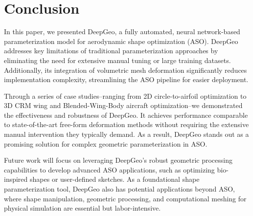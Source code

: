 \section{Conclusion}

In this paper, we presented DeepGeo, a fully automated, neural network-based parameterization model for aerodynamic shape optimization (ASO). DeepGeo addresses key limitations of traditional parameterization approaches by eliminating the need for extensive manual tuning or large training datasets. Additionally, its integration of volumetric mesh deformation significantly reduces implementation complexity, streamlining the ASO pipeline for easier deployment.

Through a series of case studies--ranging from 2D circle-to-airfoil optimization to 3D CRM wing and Blended-Wing-Body aircraft optimization--we demonstrated the effectiveness and robustness of DeepGeo. It achieves performance comparable to state-of-the-art free-form deformation methods without requiring the extensive manual intervention they typically demand. As a result, DeepGeo stands out as a promising solution for complex geometric parameterization in ASO.

Future work will focus on leveraging DeepGeo's robust geometric processing capabilities to develop advanced ASO applications, such as optimizing bio-inspired shapes or user-defined sketches. As a foundational shape parameterization tool, DeepGeo also has potential applications beyond ASO, where shape manipulation, geometric processing, and computational meshing for physical simulation are essential but labor-intensive.